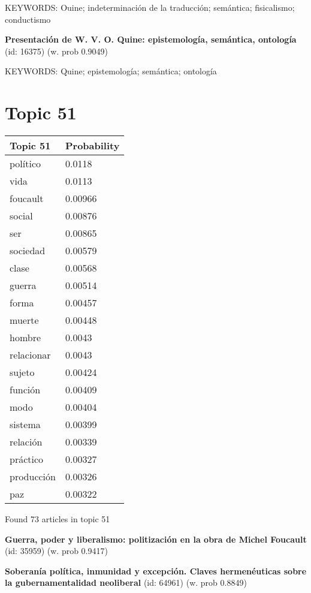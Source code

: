 \documentclass{article}
\begin{document}
KEYWORDS:
Ouine; indeterminación de la traducción; semántica; fisicalismo; conductismo
\vfill

\textbf{Presentación de W. V. O. Quine: epistemología, semántica, ontología} (id: 16375)
 (w. prob 0.9049)


KEYWORDS:
Quine; epistemología; semántica; ontología

\vfill
\newpage


\centering
\thispagestyle{empty}
\section*{Topic 51}\vfill
\begin{tabular}{ll}
\toprule
   Topic 51 & Probability \\
\midrule
   político &      0.0118 \\
       vida &      0.0113 \\
   foucault &     0.00966 \\
     social &     0.00876 \\
        ser &     0.00865 \\
   sociedad &     0.00579 \\
      clase &     0.00568 \\
     guerra &     0.00514 \\
      forma &     0.00457 \\
     muerte &     0.00448 \\
     hombre &      0.0043 \\
 relacionar &      0.0043 \\
     sujeto &     0.00424 \\
    función &     0.00409 \\
       modo &     0.00404 \\
    sistema &     0.00399 \\
   relación &     0.00339 \\
   práctico &     0.00327 \\
 producción &     0.00326 \\
        paz &     0.00322 \\
\bottomrule
\end{tabular}

\vfill
Found 73 articles in topic 51
\vfill

\textbf{Guerra, poder y liberalismo: politización en la obra de Michel Foucault} (id: 35959)
 (w. prob 0.9417)
\vfill

\textbf{Soberanía política, inmunidad y excepción. Claves hermenéuticas sobre la gubernamentalidad neoliberal} (id: 64961)
 (w. prob 0.8849)
\vfill
\end{document}

